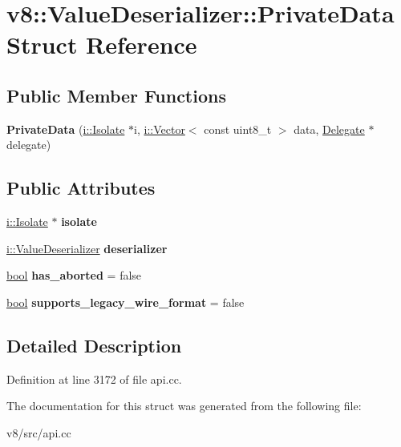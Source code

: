 \hypertarget{structv8_1_1ValueDeserializer_1_1PrivateData}{}\section{v8\+:\+:Value\+Deserializer\+:\+:Private\+Data Struct Reference}
\label{structv8_1_1ValueDeserializer_1_1PrivateData}
\subsection*{Public Member Functions}
\begin{DoxyCompactItemize}
\item 
\mbox{\label{structv8_1_1ValueDeserializer_1_1PrivateData_ace5e652cce94cd58196d016263d6daa3}} 
{\bfseries Private\+Data} (\mbox{\hyperlink{classv8_1_1internal_1_1Isolate}{i\+::\+Isolate}} $\ast$i, \mbox{\hyperlink{classv8_1_1internal_1_1Vector}{i\+::\+Vector}}$<$ const uint8\+\_\+t $>$ data, \mbox{\hyperlink{classv8_1_1ValueDeserializer_1_1Delegate}{Delegate}} $\ast$delegate)
\end{DoxyCompactItemize}
\subsection*{Public Attributes}
\begin{DoxyCompactItemize}
\item 
\mbox{\label{structv8_1_1ValueDeserializer_1_1PrivateData_a77f72f55a439b81fd2b94a727ee95e89}} 
\mbox{\hyperlink{classv8_1_1internal_1_1Isolate}{i\+::\+Isolate}} $\ast$ {\bfseries isolate}
\item 
\mbox{\label{structv8_1_1ValueDeserializer_1_1PrivateData_ac11f9c5e613525d4275927c1fde6a53c}} 
\mbox{\hyperlink{classv8_1_1internal_1_1ValueDeserializer}{i\+::\+Value\+Deserializer}} {\bfseries deserializer}
\item 
\mbox{\label{structv8_1_1ValueDeserializer_1_1PrivateData_a0cbe13888312d8d3795c8b1026b07830}} 
\mbox{\hyperlink{classbool}{bool}} {\bfseries has\+\_\+aborted} = false
\item 
\mbox{\label{structv8_1_1ValueDeserializer_1_1PrivateData_a31f45489ec00a0d14aa1fc2494d2268c}} 
\mbox{\hyperlink{classbool}{bool}} {\bfseries supports\+\_\+legacy\+\_\+wire\+\_\+format} = false
\end{DoxyCompactItemize}


\subsection{Detailed Description}


Definition at line 3172 of file api.\+cc.



The documentation for this struct was generated from the following file\+:\begin{DoxyCompactItemize}
\item 
v8/src/api.\+cc\end{DoxyCompactItemize}
